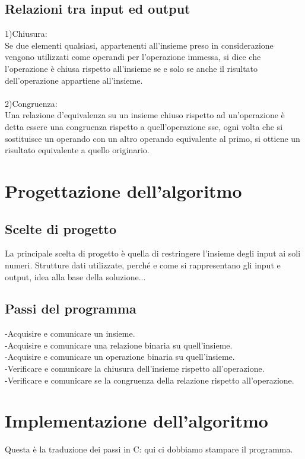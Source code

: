 \documentclass[11pt, a4paper, titlepage, block]{article}
\begin{document}
	\subsection{Relazioni tra input ed output}
	1)Chiusura:\\
	Se due elementi qualsiasi, appartenenti all'insieme preso in considerazione vengono utilizzati come operandi per l'operazione immessa, si dice che l'operazione è chiusa rispetto all'insieme se e solo se anche il risultato dell'operazione appartiene all'insieme.
	\\
	\\
	2)Congruenza:\\Una relazione d'equivalenza su un insieme chiuso rispetto ad un'operazione è detta essere una congruenza
	rispetto a quell'operazione sse, ogni volta che si sostituisce un operando con un altro operando
	equivalente al primo, si ottiene un risultato equivalente a quello originario.
	\newpage
	\section{Progettazione dell'algoritmo}
	\subsection{Scelte di progetto}
	La principale scelta di progetto è quella di restringere l'insieme degli input ai soli numeri.
	Strutture dati utilizzate, perché e come si rappresentano gli input e output, idea alla base della soluzione...
	\subsection{Passi del programma}
	-Acquisire e comunicare un insieme.\\
	-Acquisire e comunicare una relazione binaria su quell'insieme.\\
	-Acquisire e comunicare un operazione binaria su quell'insieme.\\
	-Verificare e comunicare la chiusura dell'insieme rispetto all'operazione.\\
	-Verificare e comunicare se la congruenza della relazione rispetto all'operazione.\\
	\section{Implementazione dell'algoritmo}
	Questa è la traduzione dei passi in C:
	qui ci dobbiamo stampare il programma.
\end{document}
